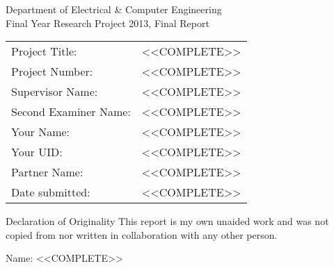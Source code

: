 \begin{titlepage}
{%
{
\Large
Department of Electrical \& Computer Engineering \\
Final Year Research Project 2013, Final Report}
}
\newline
\newline
\newline

\begin{table*}[h]
\begin{tabular}{ll}
Project Title: & <<COMPLETE>> \\
Project Number: & <<COMPLETE>> \\
Supervisor Name: & <<COMPLETE>> \\
Second Examiner Name: & <<COMPLETE>> \\
Your Name: & <<COMPLETE>> \\
Your UID: & <<COMPLETE>> \\
Partner Name: & <<COMPLETE>>  \\
Date submitted: & <<COMPLETE>> \\

\end{tabular}
\end{table*}
\begin{table}


\end{table}
\pagebreak
{\Large Declaration of Originality}
\newline
\newline
\newline
This report is my own unaided work and was not copied from 
nor written in collaboration with any other person.

Name: <<COMPLETE>> 


\end{titlepage}


